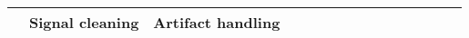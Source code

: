 \begin{tabular}{p{1.5cm}p{1.5cm}p{1.5cm}p{1.5cm}p{0.6cm}p{0.6cm}p{0.6cm}p{0.6cm}p{0.6cm}p{0.6cm}p{0.6cm}p{0.6cm}p{0.6cm}p{0.6cm}p{0.6cm}}
                                & Signal cleaning & Artifact handling &   &                                  \cite{Yang2018, Yang2016a} &                                                                                                            \cite{Wang2018a} &                                                                        &                                      &                                                            &                      &                         &                               &                     &                         &                                                   \cite{Pardede2015} \\
\bottomrule
\end{tabular}
